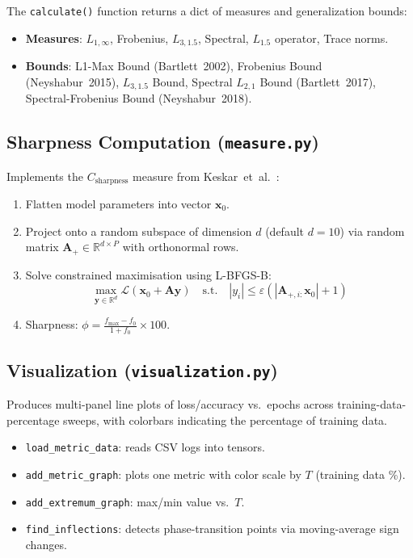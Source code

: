 \documentclass[11pt,a4paper]{article}
\theoremstyle{definition}
\begin{document}
The \texttt{calculate()} function returns a dict of measures and generalization bounds:
\begin{itemize}[leftmargin=*]
    \item \textbf{Measures}: $L_{1,\infty}$, Frobenius, $L_{3,1.5}$, Spectral, $L_{1.5}$ operator, Trace norms.
    \item \textbf{Bounds}: L1-Max Bound (Bartlett~2002), Frobenius Bound (Neyshabur~2015),
          $L_{3,1.5}$ Bound, Spectral $L_{2,1}$ Bound (Bartlett~2017), Spectral-Frobenius Bound (Neyshabur~2018).
\end{itemize}

\subsection{Sharpness Computation (\texttt{measure.py})}

Implements the $C_{\text{sharpness}}$ measure from Keskar~et~al.~\cite{keskar2016large}:

\begin{enumerate}[leftmargin=*]
    \item Flatten model parameters into vector $\mathbf{x}_0$.
    \item Project onto a random subspace of dimension $d$ (default $d=10$) via random matrix
          $\mathbf{A}_+ \in \mathbb{R}^{d \times P}$ with orthonormal rows.
    \item Solve constrained maximisation using L-BFGS-B:
          \[
          \max_{\mathbf{y} \in \mathbb{R}^d} \mathcal{L}(\mathbf{x}_0 + \mathbf{A}\mathbf{y})
          \quad\text{s.t.}\quad |y_i| \le \varepsilon(|\mathbf{A}_{+,i:}\mathbf{x}_0| + 1)
          \]
    \item Sharpness: $\phi = \frac{f_{\max} - f_0}{1 + f_0} \times 100$.
\end{enumerate}

\subsection{Visualization (\texttt{visualization.py})}

Produces multi-panel line plots of loss/accuracy vs.~epochs across training-data-percentage
sweeps, with colorbars indicating the percentage of training data.

\begin{itemize}[leftmargin=*]
    \item \texttt{load\_metric\_data}: reads CSV logs into tensors.
    \item \texttt{add\_metric\_graph}: plots one metric with color scale by $T$ (training data \%).
    \item \texttt{add\_extremum\_graph}: max/min value vs.~$T$.
    \item \texttt{find\_inflections}: detects phase-transition points via moving-average sign changes.
\end{itemize}
\end{document}
